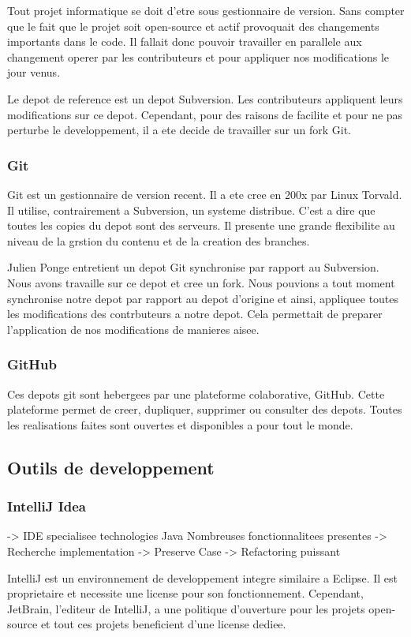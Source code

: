 Tout projet informatique se doit d'etre sous gestionnaire de version. Sans compter que le fait que le projet soit open-source et actif provoquait des changements importants dans le code. Il fallait donc pouvoir travailler en parallele aux changement operer par les contributeurs et pour appliquer nos modifications le jour venus.

Le depot de reference est un depot Subversion. Les contributeurs appliquent leurs modifications sur ce depot. Cependant, pour des raisons de facilite et pour ne pas perturbe le developpement, il a ete decide de travailler sur un fork Git.
\subsubsection{Git}
Git est un gestionnaire de version recent. Il a ete cree en 200x par Linux Torvald. Il utilise, contrairement a Subversion, un systeme distribue. C'est a dire que toutes les copies du depot sont des serveurs. Il presente une grande flexibilite au niveau de la grstion du contenu et de la creation des branches.

Julien Ponge entretient un depot Git synchronise par rapport au Subversion. Nous avons travaille sur ce depot et cree un fork. Nous pouvions a tout moment synchronise notre depot par rapport au depot d'origine et ainsi, appliquee toutes les modifications des contrbuteurs a notre depot. Cela permettait de preparer l'application de nos modifications de manieres aisee.
\subsubsection{GitHub}
Ces depots git sont hebergees par une plateforme colaborative, GitHub. Cette plateforme permet de creer, dupliquer, supprimer ou consulter des depots. Toutes les realisations faites sont ouvertes et disponibles a pour tout le monde.
\subsection{Outils de developpement}
\subsubsection{IntelliJ Idea}
-> IDE specialisee technologies Java
Nombreuses fonctionnalitees presentes
-> Recherche implementation 
-> Preserve Case
-> Refactoring puissant

IntelliJ est un environnement de developpement integre similaire a Eclipse. Il est proprietaire et necessite une license pour son fonctionnement. Cependant, JetBrain, l'editeur de IntelliJ, a une politique d'ouverture pour les projets open-source et tout ces projets beneficient d'une license dediee. 

